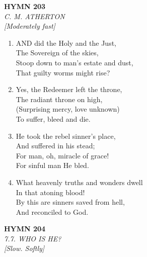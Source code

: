 \documentclass[11pt,a4paper]{article}
\begin{document}
\newpage
\begin{center}
    {\Large \textbf{HYMN 203}}
    \\
    \textit{C. M. ATHERTON}
    \\
    \textit{\small [Moderately fast]}
\end{center}
\vspace{1em}

\begin{enumerate}
    \item AND did the Holy and the Just, \\
        The Sovereign of the skies, \\
        Stoop down to man's estate and dust, \\
        That guilty worms might rise?

    \item Yes, the Redeemer left the throne, \\
        The radiant throne on high, \\
        (Surprising mercy, love unknown) \\
        To suffer, bleed and die.

    \item He took the rebel sinner's place, \\
        And suffered in his stead; \\
        For man, oh, miracle of grace! \\
        For sinful man He bled.

    \item What heavenly truths and wonders dwell \\
        In that atoning blood! \\
        By this are sinners saved from hell, \\
        And reconciled to God.

\end{enumerate}

\newpage
\begin{center}
    {\Large \textbf{HYMN 204}}
    \\
    \textit{7.7. WHO IS HE?}
    \\
    \textit{\small [Slow. Softly]}
\end{center}
\vspace{1em}
\end{document}
